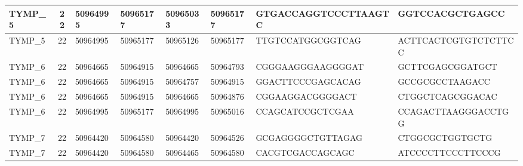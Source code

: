 \begin{landscape}
\begin{longtable}{| p{} | p{} | p{} | p{} | p{} | p{} | p{} | p{} |}
\multicolumn{1}{|l|}{TYMP\_5}    & \multicolumn{1}{c|}{22} & \multicolumn{1}{l|}{50964995}  & \multicolumn{1}{l|}{50965177}  & \multicolumn{1}{l|}{50965033}  & \multicolumn{1}{l|}{50965177}  & \multicolumn{1}{l|}{GTGACCAGGTCCCTTAAGTC}            & \multicolumn{1}{l|}{GGTCCACGCTGAGCC}               \\ \hline
\multicolumn{1}{|l|}{TYMP\_5}    & \multicolumn{1}{c|}{22} & \multicolumn{1}{l|}{50964995}  & \multicolumn{1}{l|}{50965177}  & \multicolumn{1}{l|}{50965126}  & \multicolumn{1}{l|}{50965177}  & \multicolumn{1}{l|}{TTGTCCATGGCGGTCAG}               & \multicolumn{1}{l|}{ACTTCACTCGTGTCTCTTCC}          \\ \hline
\multicolumn{1}{|l|}{TYMP\_6}    & \multicolumn{1}{c|}{22} & \multicolumn{1}{l|}{50964665}  & \multicolumn{1}{l|}{50964915}  & \multicolumn{1}{l|}{50964665}  & \multicolumn{1}{l|}{50964793}  & \multicolumn{1}{l|}{CGGGAAGGGAAGGGGAT}               & \multicolumn{1}{l|}{GCTTCGAGCGGATGCT}              \\ \hline
\multicolumn{1}{|l|}{TYMP\_6}    & \multicolumn{1}{c|}{22} & \multicolumn{1}{l|}{50964665}  & \multicolumn{1}{l|}{50964915}  & \multicolumn{1}{l|}{50964757}  & \multicolumn{1}{l|}{50964915}  & \multicolumn{1}{l|}{GGACTTCCCGAGCACAG}               & \multicolumn{1}{l|}{GCCGCGCCTAAGACC}               \\ \hline
\multicolumn{1}{|l|}{TYMP\_6}    & \multicolumn{1}{c|}{22} & \multicolumn{1}{l|}{50964665}  & \multicolumn{1}{l|}{50964915}  & \multicolumn{1}{l|}{50964665}  & \multicolumn{1}{l|}{50964876}  & \multicolumn{1}{l|}{CGGAAGGACGGGGACT}                & \multicolumn{1}{l|}{CTGGCTCAGCGGACAC}              \\ \hline
\multicolumn{1}{|l|}{TYMP\_6}    & \multicolumn{1}{c|}{22} & \multicolumn{1}{l|}{50964995}  & \multicolumn{1}{l|}{50965177}  & \multicolumn{1}{l|}{50964995}  & \multicolumn{1}{l|}{50965016}  & \multicolumn{1}{l|}{CCAGCATCCGCTCGAA}                & \multicolumn{1}{l|}{CCAGACTTAAGGGACCTGG}           \\ \hline
\multicolumn{1}{|l|}{TYMP\_7}    & \multicolumn{1}{c|}{22} & \multicolumn{1}{l|}{50964420}  & \multicolumn{1}{l|}{50964580}  & \multicolumn{1}{l|}{50964420}  & \multicolumn{1}{l|}{50964526}  & \multicolumn{1}{l|}{GCGAGGGGCTGTTAGAG}               & \multicolumn{1}{l|}{CTGGCGCTGGTGCTG}               \\ \hline
\multicolumn{1}{|l|}{TYMP\_7}    & \multicolumn{1}{c|}{22} & \multicolumn{1}{l|}{50964420}  & \multicolumn{1}{l|}{50964580}  & \multicolumn{1}{l|}{50964465}  & \multicolumn{1}{l|}{50964580}  & \multicolumn{1}{l|}{CACGTCGACCAGCAGC}                & \multicolumn{1}{l|}{ATCCCCTTCCCTTCCCG}             \\ \hline

\end{longtable}
\end{landscape}
